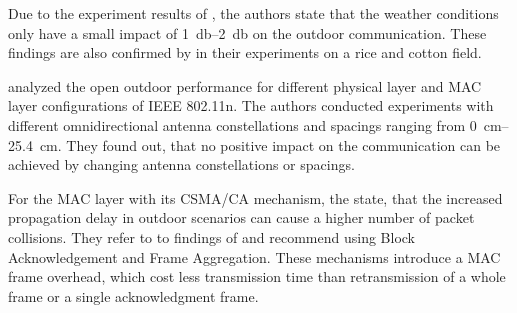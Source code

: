 Due to the experiment results of \cite{chebrolu_long-distance_2006}, the authors state that the weather conditions only have a
small impact of \SIrange{1}{2}{\decibel} on the outdoor communication. These findings are also confirmed by \cite{brinkhoff_characterization_2017}
in their experiments on a rice and cotton field.

\textcite{paul_characterizing_2011} analyzed the open outdoor performance for different physical layer and MAC layer configurations of
IEEE 802.11n. The authors conducted experiments with different omnidirectional antenna constellations and spacings ranging from
\SIrange{0}{25.4}{\centi\metre}. They found out, that no positive impact on the communication can be achieved by
changing antenna constellations or spacings.

For the MAC layer with its CSMA/CA mechanism, the \textcite{aust_outdoor_2015} state, that the increased propagation delay in outdoor scenarios
can cause a higher number of packet collisions. They refer to to findings of \cite{paul_characterizing_2011} and recommend
using Block Acknowledgement and Frame Aggregation. These mechanisms introduce a MAC frame overhead, which cost less transmission time than
retransmission of a whole frame or a single acknowledgment frame.


